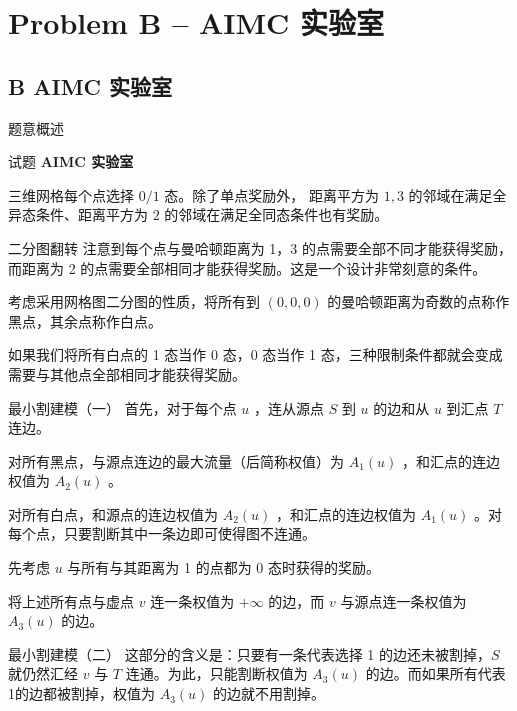 \documentclass{beamer}
\newcommand{\TT}[1]{{\ttfamily #1}}
\newcommand{\BF}[1]{\textbf{#1}}
\begin{document}
{
\section[B]{Problem B -- AIMC 实验室}
\subsection{B AIMC 实验室}
\begin{frame}{题意概述}
  \begin{center}试题 \myboxii{\BF{\TT{B}}} \BF{AIMC 实验室}\end{center}
  三维网格每个点选择 $0/1$ 态。除了单点奖励外，
  距离平方为 $1,3$ 的邻域在满足全异态条件、距离平方为 $2$ 的邻域在满足全同态条件也有奖励。
\end{frame}


\begin{frame}{二分图翻转}
  注意到每个点与曼哈顿距离为 1，3 的点需要全部不同才能获得奖励，而距离为 2 的点需要全部相同才能获得奖励。这是一个设计非常刻意的条件。
  
  考虑采用网格图二分图的性质，将所有到 $(0,0,0)$ 的曼哈顿距离为奇数的点称作黑点，其余点称作白点。
  
  如果我们将所有白点的 1 态当作 0 态，0 态当作 1 态，三种限制条件都就会变成需要与其他点全部相同才能获得奖励。
\end{frame}

\begin{frame}{最小割建模（一）}
首先，对于每个点 $u$ ，连从源点 $S$ 到 $u$ 的边和从 $u$ 到汇点 $T$ 连边。
\vspace{0.5em}

对所有黑点，与源点连边的最大流量（后简称权值）为 $A_1(u)$ ，和汇点的连边权值为 $A_2(u)$ 。
\vspace{0.5em}

对所有白点，和源点的连边权值为 $A_2(u)$ ，和汇点的连边权值为 $A_1(u)$ 。对每个点，只要割断其中一条边即可使得图不连通。
\vspace{0.5em}

先考虑 $u$ 与所有与其距离为 1 的点都为 0 态时获得的奖励。

将上述所有点与虚点 $v$ 连一条权值为 $+\infty$ 的边，而 $v$ 与源点连一条权值为 $A_3(u)$ 的边。
\end{frame}

\begin{frame}{最小割建模（二）}
这部分的含义是：只要有一条代表选择 1 的边还未被割掉，$S$ 就仍然汇经 $v$ 与 $T$ 连通。为此，只能割断权值为 $A_3(u)$ 的边。而如果所有代表1的边都被割掉，权值为 $A_3(u)$ 的边就不用割掉。
\vspace{0.5em}


\end{frame}}
\end{document}
